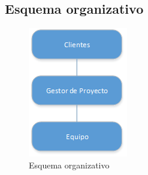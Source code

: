 \subsection{Esquema organizativo}

\begin{figure}[!htp]
	\centering
	\includegraphics[scale=1.0]{fig/esquema_organizativo}
	\caption{Esquema organizativo}\label{fig:org_schema}
\end{figure}